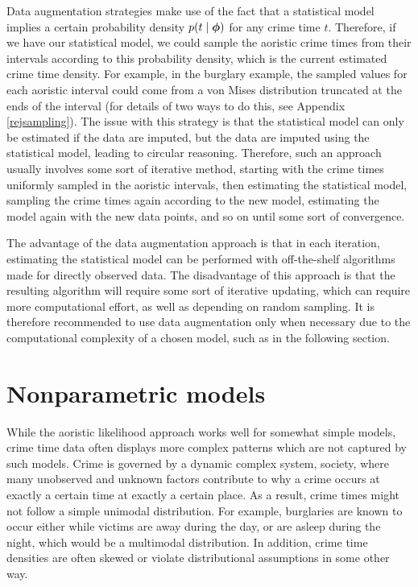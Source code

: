 Data augmentation strategies \citep{tanner1987calculation, gelfand1990sampling, van2001art} make use of the fact that a statistical model implies a certain probability density $p(t \mid \boldsymbol{\phi})$ for any crime time $t$. Therefore, if we have our statistical model, we could sample the aoristic crime times from their intervals according to this probability density, which is the current estimated crime time density. For example, in the burglary example, the sampled values for each aoristic interval could come from a von Mises distribution truncated at the ends of the interval (for details of two ways to do this, see Appendix \ref{rejsampling}). The issue with this strategy is that the statistical model can only be estimated if the data are imputed, but the data are imputed using the statistical model, leading to circular reasoning. Therefore, such an approach usually involves some sort of iterative method, starting with the crime times uniformly sampled in the aoristic intervals, then estimating the statistical model, sampling the crime times again according to the new model, estimating the model again with the new data points, and so on until some sort of convergence.

The advantage of the data augmentation approach is that in each iteration, estimating the statistical model can be performed with off-the-shelf algorithms made for directly observed data. The disadvantage of this approach is that the resulting algorithm will require some sort of iterative updating, which can require more computational effort, as well as depending on random sampling. It is therefore recommended to use data augmentation only when necessary due to the computational complexity of a chosen model, such as in the following section.

\section{Nonparametric models} \label{dpm}

While the aoristic likelihood approach works well for somewhat simple models, crime time data often displays more complex patterns which are not captured by such models. Crime is governed by a dynamic complex system, society, where many unobserved and unknown factors contribute to why a crime occurs at exactly a certain time at exactly a certain place. As a result, crime times might not follow a simple unimodal distribution. For example, burglaries are known to occur either while victims are away during the day, or are asleep during the night, which would be a multimodal distribution. In addition, crime time densities are often skewed or violate distributional assumptions in some other way.

